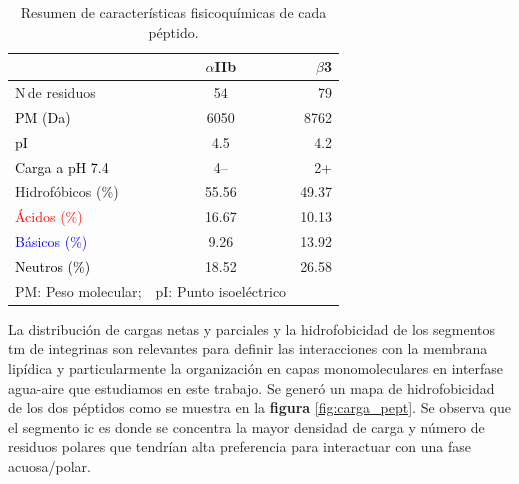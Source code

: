     
\begin{table}[H]   
\centering 
  \caption{Resumen de características fisicoquímicas de cada péptido.}\label{tab:percent_hidrofo}
    \begin{tabular}{lcr}

     \toprule  %
       & $\alpha$IIb & $\beta$3\\
     \bottomrule %
		N\textdegree \,de residuos							&54 		&79\\
      \textcolor{black}{PM (Da)}            & 6050  & 8762\\
      \textcolor{black}{pI}            		& 4.5  & 4.2\\
      \textcolor{black}{Carga a pH 7.4}            & 4--  & 2+\\
        \textcolor{mygreen}{Hidrofóbicos (\%)}   & 55.56 & 49.37\\
        \textcolor{red}{Ácidos (\%)}            & 16.67 & 10.13\\
        \textcolor{blue}{Básicos (\%)}            & 9.26  & 13.92\\
        \textcolor{black}{Neutros (\%)}          & 18.52 & 26.58\\ %
      \bottomrule %
      \scriptsize{PM: Peso  molecular}; & \scriptsize{pI: Punto isoeléctrico}
    \end{tabular}
    
    \end{table}



La distribución de cargas netas y parciales y la hidrofobicidad de los segmentos \ac{tm} de integrinas son relevantes para definir las interacciones con la membrana lipídica y particularmente la organización en capas monomoleculares en interfase agua-aire que estudiamos en este trabajo. Se generó un mapa de hidrofobicidad de los dos péptidos como se muestra en la \textbf{figura} \ref{fig:carga_pept}. Se observa que el segmento \ac{ic} es donde se concentra la mayor densidad de carga y número de residuos polares que tendrían alta preferencia para interactuar con una fase acuosa/polar. 

